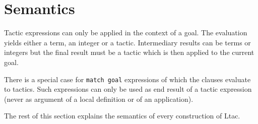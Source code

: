 \begin{table}[ht]
\noindent{}
\caption{Tactic toplevel definitions}
\label{ltactop}
\end{table}


\section{Semantics}
\label{Tacticals}

Tactic expressions can only be applied in the context of a goal.  The
evaluation yields either a term, an integer or a tactic. Intermediary
results can be terms or integers but the final result must be a tactic
which is then applied to the current goal.

There is a special case for {\tt match goal} expressions of which
the clauses evaluate to tactics. Such expressions can only be used as
end result of a tactic expression (never as argument of a local
definition or of an application).

The rest of this section explains the semantics of every construction
of Ltac.




